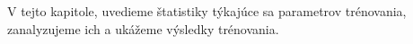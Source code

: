 V tejto kapitole, uvedieme štatistiky týkajúce sa parametrov trénovania, zanalyzujeme ich a ukážeme výsledky trénovania.
